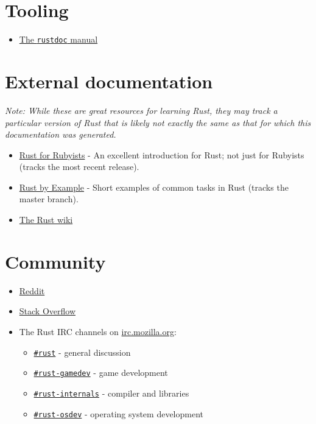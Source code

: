 \documentclass[]{article}
\begin{document}
\section{Tooling}\label{tooling}

\begin{itemize}
\itemsep1pt\parskip0pt
\item
  \href{rustdoc.html}{The \texttt{rustdoc} manual}
\end{itemize}

\section{External documentation}\label{external-documentation}

\emph{Note: While these are great resources for learning Rust, they may
track a particular version of Rust that is likely not exactly the same
as that for which this documentation was generated.}

\begin{itemize}
\itemsep1pt\parskip0pt
\item
  \href{http://www.rustforrubyists.com/}{Rust for Rubyists} - An
  excellent introduction for Rust; not just for Rubyists (tracks the
  most recent release).
\item
  \href{http://rustbyexample.com/}{Rust by Example} - Short examples of
  common tasks in Rust (tracks the master branch).
\item
  \href{http://github.com/rust-lang/rust/wiki}{The Rust wiki}
\end{itemize}

\section{Community}\label{community}

\begin{itemize}
\itemsep1pt\parskip0pt
\item
  \href{http://reddit.com/r/rust}{Reddit}
\item
  \href{http://stackoverflow.com/questions/tagged/rust}{Stack Overflow}
\item
  The Rust IRC channels on
  \href{http://irc.mozilla.org/}{irc.mozilla.org}:

  \begin{itemize}
  \itemsep1pt\parskip0pt
  \item
    \href{http://chat.mibbit.com/?server=irc.mozilla.org\&channel=\%23rust}{\texttt{\#rust}}
    - general discussion
  \item
    \href{http://chat.mibbit.com/?server=irc.mozilla.org\&channel=\%23rust-gamedev}{\texttt{\#rust-gamedev}}
    - game development
  \item
    \href{http://chat.mibbit.com/?server=irc.mozilla.org\&channel=\%23rust-internals}{\texttt{\#rust-internals}}
    - compiler and libraries
  \item
    \href{http://chat.mibbit.com/?server=irc.mozilla.org\&channel=\%23rust-osdev}{\texttt{\#rust-osdev}}
    - operating system development
  \end{itemize}
\end{itemize}
\end{document}
